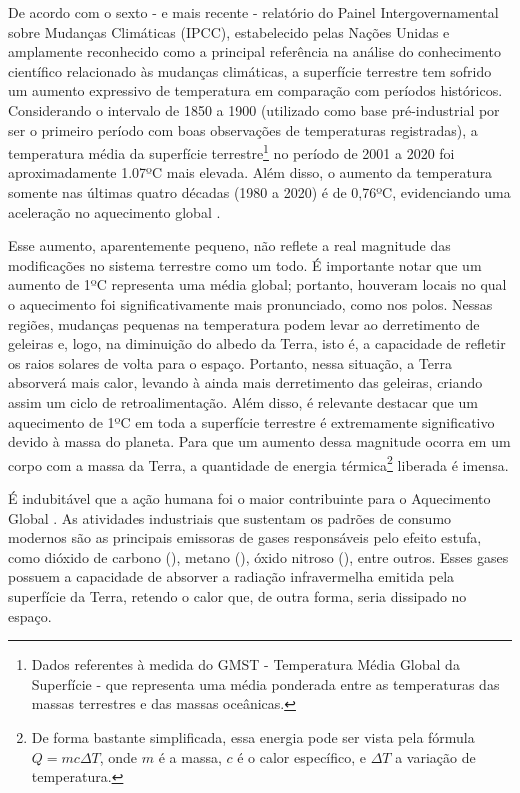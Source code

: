De acordo com o sexto - e mais recente - relatório do Painel Intergovernamental sobre Mudanças Climáticas (IPCC),
estabelecido pelas Nações Unidas e amplamente reconhecido como a principal referência na análise do conhecimento
científico relacionado às mudanças climáticas, a superfície terrestre tem sofrido um aumento expressivo de temperatura
em comparação com períodos históricos. Considerando o intervalo de 1850 a 1900 (utilizado como base pré-industrial por
ser o primeiro período com boas observações de temperaturas registradas), a temperatura média da superfície
terrestre\footnote{Dados referentes à medida do GMST - Temperatura Média Global da Superfície - que representa uma média
ponderada entre as temperaturas das massas terrestres e das massas oceânicas.} no período de 2001 a 2020 foi
aproximadamente 1.07ºC mais elevada. Além disso, o aumento da temperatura somente nas últimas quatro décadas (1980 a
2020) é de 0,76ºC, evidenciando uma aceleração no aquecimento global \cite{gulev}.

Esse aumento, aparentemente pequeno, não reflete a real magnitude das modificações no sistema terrestre como um todo. É
importante notar que um aumento de 1ºC representa uma média global; portanto, houveram locais no qual o aquecimento foi
significativamente mais pronunciado, como nos polos. Nessas regiões, mudanças pequenas na temperatura podem levar ao
derretimento de geleiras e, logo, na diminuição do albedo da Terra, isto é, a capacidade de refletir os raios solares de
volta para o espaço. Portanto, nessa situação, a Terra absorverá mais calor, levando à ainda mais derretimento das
geleiras, criando assim um ciclo de retroalimentação. Além disso, é relevante destacar que um aquecimento de 1ºC em toda
a superfície terrestre é extremamente significativo devido à massa do planeta. Para que um aumento dessa magnitude
ocorra em um corpo com a massa da Terra, a quantidade de energia térmica\footnote{De forma bastante simplificada, essa
energia pode ser vista pela fórmula $ Q = mc\Delta T $, onde $m$ é a massa, $c$ é o calor específico, e $\Delta T$ a
variação de temperatura.} liberada é imensa.

É indubitável que a ação humana foi o maior contribuinte para o Aquecimento Global \cite{ipcc, gillett}. As atividades
industriais que sustentam os padrões de consumo modernos são as principais emissoras de gases responsáveis pelo efeito
estufa, como dióxido de carbono (), metano (), óxido nitroso (), entre outros. Esses gases
possuem a capacidade de absorver a radiação infravermelha emitida pela superfície da Terra, retendo o calor que, de
outra forma, seria dissipado no espaço. 

